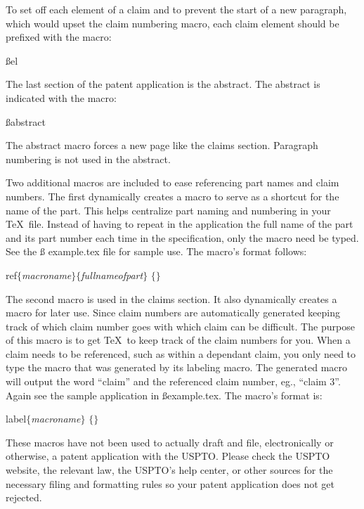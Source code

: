 To set off each element of a claim and to prevent the start of a new
paragraph, which would upset the claim numbering macro, each claim
element should be prefixed with the macro:

\ss\bs el
\rm

The last section of the patent application is the abstract.  The abstract
is indicated with the macro:

\ss\bs abstract
\rm

The abstract macro forces a new page like the claims section. 
Paragraph numbering is not used in the abstract.


Two additional macros are included to ease referencing part names and
claim numbers.  The first dynamically creates a macro to serve as a
shortcut for the name of the part.  This helps centralize part naming
and numbering in your \TeX\ file.  Instead of having to repeat in the
application the full name of the part and its part number each time in
the specification, only the macro need be typed.  See the \ss
example.tex\rm{} file for sample use.  The macro's format follows:

\indent   \bs ref$\{${\it macroname}$\}$$\{${\it fullnameofpart}$\}$\nl
\indent   {}$\{$$\}$
          \rm

The second macro is used in the claims section.  It also dynamically
creates a macro for later use.  Since claim numbers are automatically
generated keeping track of which claim number goes with which claim
can be difficult.  The purpose of this macro is to get \TeX\ to keep
track of the claim numbers for you.  When a claim needs to be
referenced, such as within a dependant claim, you only need to type
the macro that was generated by its labeling macro.  The
generated macro will output the word ``claim'' and the referenced
claim number, eg., ``claim 3''.  Again see the sample
application in \ss example.tex\rm.  The macro's format is:

\indent   \bs label$\{${\it macroname}$\}$\nl
\indent   {}$\{$$\}$
          \rm



These macros have not been used to actually draft and file,
electronically or otherwise, a patent application with the USPTO.
Please check the USPTO website, the relevant law, the USPTO's help
center, or other sources for the necessary filing and formatting
rules so your patent application does not get rejected.

